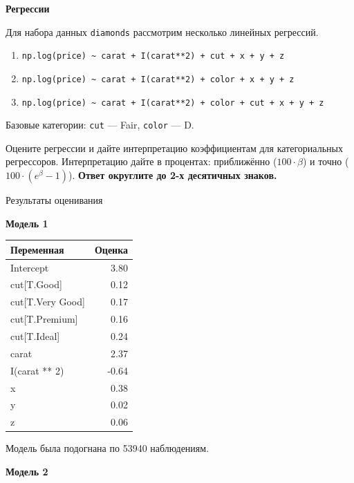 \documentclass[
  russian,
]{article}
\newcounter{none} %
\providecommand{\tightlist}{%
  \setlength{\itemsep}{0pt}\setlength{\parskip}{0pt}}
\begin{document}
\textbf{Регрессии}

Для набора данных \texttt{diamonds} рассмотрим несколько линейных
регрессий.

\begin{enumerate}
\def\labelenumi{\arabic{enumi}.}
\tightlist
\item
  \texttt{np.log(price)\ \textasciitilde{}\ carat\ +\ I(carat**2)\ +\ cut\ +\ x\ +\ y\ +\ z}
\item
  \texttt{np.log(price)\ \textasciitilde{}\ carat\ +\ I(carat**2)\ +\ color\ +\ x\ +\ y\ +\ z}
\item
  \texttt{np.log(price)\ \textasciitilde{}\ carat\ +\ I(carat**2)\ +\ color\ +\ cut\ +\ x\ +\ y\ +\ z}
\end{enumerate}

Базовые категории: \texttt{cut} --- Fair, \texttt{color} --- D.

Оцените регрессии и дайте интерпретацию коэффициентам для категориальных
регрессоров. Интерпретацию дайте в процентах: приближённо
(\(100\cdot\beta\)) и точно (\(100\cdot(e^{\beta}-1)\)). \textbf{Ответ
округлите до 2-х десятичных знаков.}

Результаты оценивания

\textbf{Модель 1}

{\def\LTcaptype{none} %
\begin{longtable}[]{@{}lr@{}}
\toprule\noalign{}
Переменная & Оценка \\
\midrule\noalign{}
\endhead
\bottomrule\noalign{}
\endlastfoot
Intercept & 3.80 \\
cut{[}T.Good{]} & 0.12 \\
cut{[}T.Very Good{]} & 0.17 \\
cut{[}T.Premium{]} & 0.16 \\
cut{[}T.Ideal{]} & 0.24 \\
carat & 2.37 \\
I(carat ** 2) & -0.64 \\
x & 0.38 \\
y & 0.02 \\
z & 0.06 \\
\end{longtable}
}

Модель была подогнана по 53940 наблюдениям.

\textbf{Модель 2}
\end{document}
